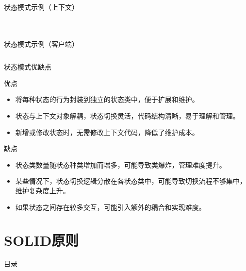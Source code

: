 \documentclass[UTF8,aspectratio=169]{beamer}
\begin{document}
\begin{frame}{状态模式示例（上下文）}
    \begin{columns}
        \begin{column}{0.48\textwidth}
            \inputminted[firstline=48, lastline=62]{cpp}{code/state_pattern.cpp}
        \end{column}
        \begin{column}{0.48\textwidth}
            \inputminted[firstline=64, lastline=75]{cpp}{code/state_pattern.cpp}
        \end{column}
    \end{columns}
\end{frame}

\begin{frame}{状态模式示例（客户端）}
    \inputminted[firstline=82, lastline=101]{cpp}{code/state_pattern.cpp}
\end{frame}

\begin{frame}{状态模式优缺点}
    \begin{ytublock}{优点}
        \begin{itemize}
            \item 将每种状态的行为封装到独立的状态类中，便于扩展和维护。
            \item 状态与上下文对象解耦，状态切换灵活，代码结构清晰，易于理解和管理。
            \item 新增或修改状态时，无需修改上下文代码，降低了维护成本。
        \end{itemize}
    \end{ytublock}
    \begin{alertytublock}{缺点}
        \begin{itemize}
            \item 状态类数量随状态种类增加而增多，可能导致类爆炸，管理难度提升。
            \item 某些情况下，状态切换逻辑分散在各状态类中，可能导致切换流程不够集中，维护复杂度上升。
            \item 如果状态之间存在较多交互，可能引入额外的耦合和实现难度。
        \end{itemize}
    \end{alertytublock}
\end{frame}

\section{SOLID原则}
\begin{frame}{目录}
    \begin{multicols}{2}
    \end{multicols}
\end{frame}
\end{document}
